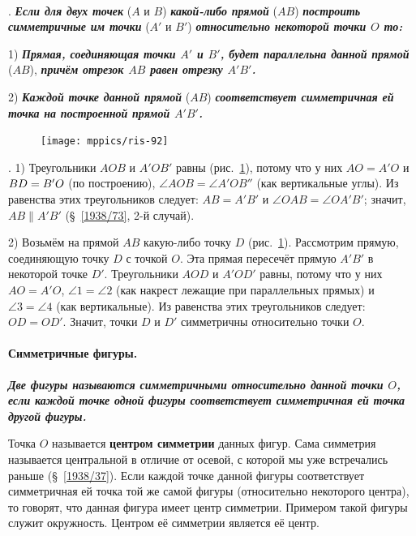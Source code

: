 \documentclass[oneside]{book}
\begin{document}
\paragraph{}\label{1938/85}
.
\textbf{\emph{Если для двух точек}} ($A$ и $B$) \textbf{\emph{какой-либо прямой}} ($AB$) \textbf{\emph{построить симметричные им точки}} ($A'$ и $B'$) \textbf{\emph{относительно некоторой точки $O$ то:}}

1) \textbf{\emph{Прямая, соединяющая точки $A'$ и $B'$, будет параллельна данной прямой}} ($AB$), \textbf{\emph{причём отрезок $AB$ равен отрезку $A'B'$.}}

2) \textbf{\emph{Каждой точке данной прямой}} ($AB$) \textbf{\emph{соответствует симметричная ей точка на построенной прямой $A'B'$.}}

\begin{figure}
\centering
\texttt{[image: mppics/ris-92]}
\caption{}\label{1938/ris-92}
\end{figure}

\mbox{.}
1) Треугольники $AOB$ и $A'OB'$ равны (рис.~\ref{1938/ris-92}), потому что у них $AO=A'O$ и $BD\z=B'O$ (по построению), $\angle AOB=\angle A'OB''$ (как вертикальные углы).
Из равенства этих треугольников следует:
$AB=A'B'$ и $\angle OAB = \angle OA'B'$;
значит, $AB\parallel A'B'$ (§~\ref{1938/73}, 2-й случай).

2) Возьмём на прямой $AB$ какую-либо точку $D$ (рис.~\ref{1938/ris-92}).
Рассмотрим прямую, соединяющую точку $D$ с точкой $O$.
Эта прямая пересечёт прямую $A'B'$ в некоторой точке $D'$.
Треугольники $AOD$ и $A'OD'$ равны, потому что у них $AO=A'O$, $\angle 1 = \angle 2$ (как накрест лежащие при параллельных прямых) и $\angle 3 = \angle 4$ (как вертикальные).
Из равенства этих треугольников следует:
$OD = OD'$.
Значит, точки $D$ и $D'$ симметричны относительно точки $O$.

\paragraph{Симметричные фигуры.}\label{1938/86}
\textbf{\emph{Две фигуры называются симметричными относительно данной точки $O$, если каждой точке одной фигуры соответствует симметричная ей точка другой фигуры.}}

Точка $O$ называется \textbf{центром симметрии} данных фигур.
Сама симметрия называется центральной в отличие от осевой, с которой мы уже встречались раньше (§~\ref{1938/37}).
Если каждой точке данной фигуры соответствует симметричная ей точка той же самой фигуры (относительно некоторого центра), то говорят, что данная фигура имеет центр симметрии.
Примером такой фигуры служит окружность.
Центром её симметрии является её центр.
\end{document}

